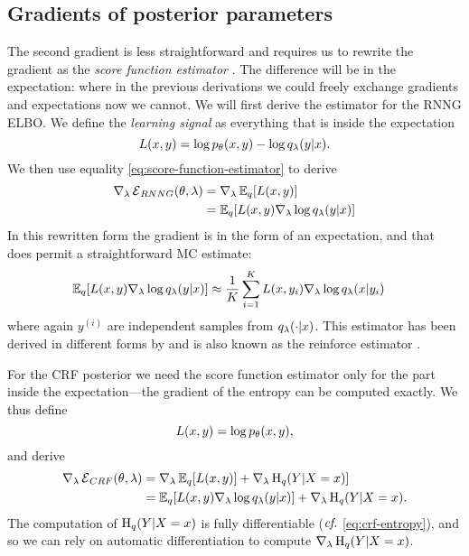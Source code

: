   \subsection{Gradients of posterior parameters}
    The second gradient is less straightforward and requires us to rewrite the gradient as the \textit{score function estimator} \citep{fu2006gradient}. The difference will be in the expectation: where in the previous derivations we could freely exchange gradients and expectations now we cannot. We will first derive the estimator for the RNNG ELBO. We define the \textit{learning signal} as everything that is inside the expectation
    \begin{equation}
      L(x, y) = \log p_{\theta}(x, y) - \log q_{\lambda}(y | x).
    \end{equation}
    We then use equality \ref{eq:score-function-estimator} to derive
    \begin{align}
      \nabla_{\lambda} \operatorname{\mathcal{E}}_{RNNG}(\theta, \lambda)
        &= \nabla_{\lambda} \operatorname{\mathbb{E}}_q [ L(x, y) ]  \nonumber \\
        &= \operatorname{\mathbb{E}}_q [ L(x, y) \nabla_{\lambda} \log q_{\lambda}(y | x) ]
    \end{align}
    In this rewritten form the gradient is in the form of an expectation, and that does permit a straightforward MC estimate:
    \begin{align}
      \operatorname{\mathbb{E}}_q [ L(x, y) \nabla_{\lambda} \log q_{\lambda}(y | x) ]
        &\approx \frac{1}{K}\sum_{i=1}^K  L(x, y_i)\nabla_{\lambda} \log q_{\lambda}(x | y_i)
    \end{align}
    where again $y^{(i)}$ are independent samples from $q_{\lambda}(\cdot | x)$. This estimator has been derived in different forms by \citet{williams1992reinforce,paisley2012viss,mnih2014nvil,ranganath2014black,miao2016discrete} and is also known as the reinforce estimator \citep{williams1992reinforce}.

    For the CRF posterior we need the score function estimator only for the part inside the expectation---the gradient of the entropy can be computed exactly. We thus define
    \begin{equation}
      L(x, y) = \log p_{\theta}(x, y),
    \end{equation}
    and derive
    \begin{align*}
      \nabla_{\lambda} \operatorname{\mathcal{E}}_{CRF}(\theta, \lambda)
        &= \nabla_{\lambda} \operatorname{\mathbb{E}}_q [ L(x, y) ] +  \nabla_{\lambda} \operatorname{H}_q( Y | X = x) ] \\
        &= \operatorname{\mathbb{E}}_q [ L(x, y) \nabla_{\lambda} \log q_{\lambda}(y | x) ] + \nabla_{\lambda} \operatorname{H}_q( Y | X = x).
    \end{align*}
    The computation of $\operatorname{H}_q( Y | X = x)$ is fully differentiable ($\emph{cf.}$ \ref{eq:crf-entropy}), and so we can rely on automatic differentiation to compute $\nabla_{\lambda} \operatorname{H}_q( Y | X = x)$.

